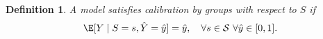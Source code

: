 \documentclass[11pt]{article} %
\newcommand{\indep}{\perp \!\!\! \perp}
\newtheorem{definition}[theorem]{Definition}
\begin{document}

\begin{definition}
\label{def:calibrationwithingroups}
    A model satisfies \emph{calibration by groups} with respect to $S$ if 
    \begin{displaymath}
        \E[Y \mid S=s, \hat{Y}=\hat{y}] = \hat{y}, \quad \forall s \in \mathcal{S} \thinspace \thinspace \forall \hat{y} \in [0,1].
    \end{displaymath}
\end{definition}
\end{document}

